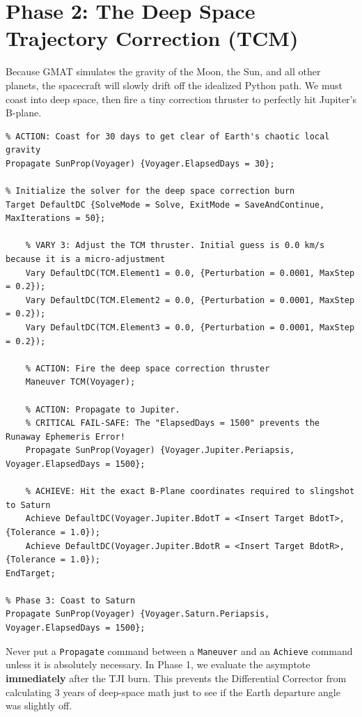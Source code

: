 \documentclass[11pt, letterpaper]{article}
\begin{document}
\section*{Phase 2: The Deep Space Trajectory Correction (TCM)}
Because GMAT simulates the gravity of the Moon, the Sun, and all other planets, the spacecraft will slowly drift off the idealized Python path. We must coast into deep space, then fire a tiny correction thruster to perfectly hit Jupiter's B-plane.

\begin{lstlisting}
% ACTION: Coast for 30 days to get clear of Earth's chaotic local gravity
Propagate SunProp(Voyager) {Voyager.ElapsedDays = 30};

% Initialize the solver for the deep space correction burn
Target DefaultDC {SolveMode = Solve, ExitMode = SaveAndContinue, MaxIterations = 50};
    
    % VARY 3: Adjust the TCM thruster. Initial guess is 0.0 km/s because it is a micro-adjustment
    Vary DefaultDC(TCM.Element1 = 0.0, {Perturbation = 0.0001, MaxStep = 0.2});
    Vary DefaultDC(TCM.Element2 = 0.0, {Perturbation = 0.0001, MaxStep = 0.2});
    Vary DefaultDC(TCM.Element3 = 0.0, {Perturbation = 0.0001, MaxStep = 0.2});

    % ACTION: Fire the deep space correction thruster
    Maneuver TCM(Voyager);

    % ACTION: Propagate to Jupiter. 
    % CRITICAL FAIL-SAFE: The "ElapsedDays = 1500" prevents the Runaway Ephemeris Error!
    Propagate SunProp(Voyager) {Voyager.Jupiter.Periapsis, Voyager.ElapsedDays = 1500};

    % ACHIEVE: Hit the exact B-Plane coordinates required to slingshot to Saturn
    Achieve DefaultDC(Voyager.Jupiter.BdotT = <Insert Target BdotT>, {Tolerance = 1.0});
    Achieve DefaultDC(Voyager.Jupiter.BdotR = <Insert Target BdotR>, {Tolerance = 1.0});
EndTarget;

% Phase 3: Coast to Saturn
Propagate SunProp(Voyager) {Voyager.Saturn.Periapsis, Voyager.ElapsedDays = 1500};
\end{lstlisting}

\begin{tcolorbox}[colback=red!5!white,colframe=red!75!black,title=The Targeter Rule]
Never put a \texttt{Propagate} command between a \texttt{Maneuver} and an \texttt{Achieve} command unless it is absolutely necessary. In Phase 1, we evaluate the asymptote \textbf{immediately} after the TJI burn. This prevents the Differential Corrector from calculating 3 years of deep-space math just to see if the Earth departure angle was slightly off.
\end{tcolorbox}
\end{document}
